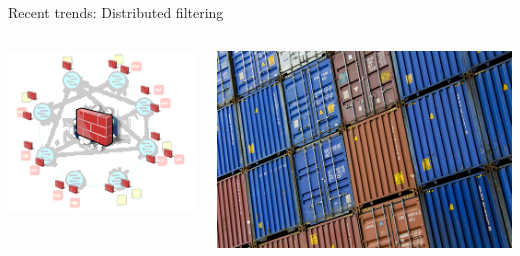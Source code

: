 \documentclass[black,white]{beamer}
\begin{document}

    \begin{frame}{Recent trends: Distributed filtering}
        \begin{columns}[c]
            \begin{column}{0.5\textwidth}
                \includegraphics[width=1.0\textwidth]{dfw.png}
            \end{column}
            \begin{column}{0.5\textwidth}
                \includegraphics[width=1.0\textwidth]{containers.jpg}

\end{column}
\end{columns}
\end{frame}
\end{document}
